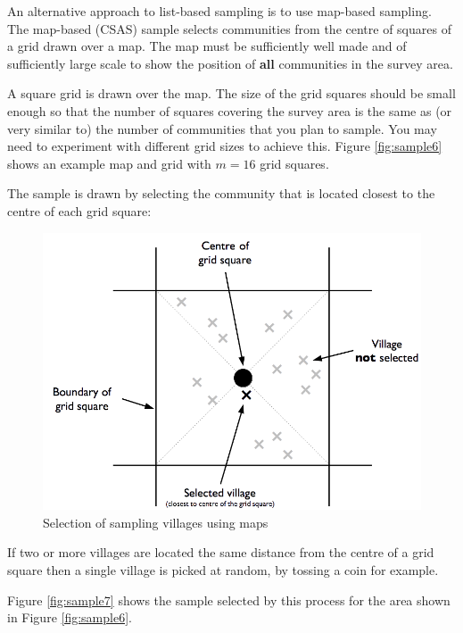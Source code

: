 \documentclass[12pt,a4paper]{book}
\theoremstyle{definition}
\theoremstyle{definition}
\theoremstyle{definition}
\theoremstyle{remark}
\begin{document}
An alternative approach to list-based sampling is to use map-based
sampling. The map-based (CSAS) sample selects communities from the
centre of squares of a grid drawn over a map. The map must be
sufficiently well made and of sufficiently large scale to show the
position of \textbf{all} communities in the survey area.

A square grid is drawn over the map. The size of the grid squares should
be small enough so that the number of squares covering the survey area
is the same as (or very similar to) the number of communities that you
plan to sample. You may need to experiment with different grid sizes to
achieve this. Figure \ref{fig:sample6} shows an example map and grid
with \(m = 16\) grid squares.

The sample is drawn by selecting the community that is located closest
to the centre of each grid square:

\begin{figure}[H]

{\centering \includegraphics{figures/mapSample1} 

}

\caption{Selection of sampling villages using maps}\label{fig:sample5}
\end{figure}

If two or more villages are located the same distance from the centre of
a grid square then a single village is picked at random, by tossing a
coin for example.

Figure \ref{fig:sample7} shows the sample selected by this process for
the area shown in Figure \ref{fig:sample6}.
\end{document}
